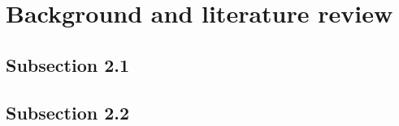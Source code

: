 \section{Background and literature review}
\label{sec:problem_description}
\subsection{Subsection 2.1}
\subsection{Subsection 2.2}

\FloatBarrier
